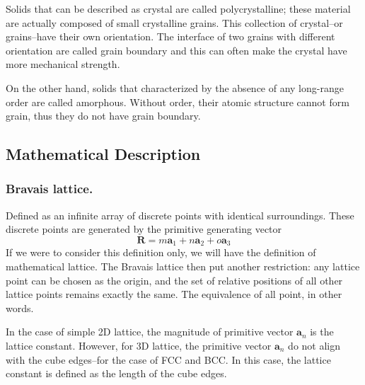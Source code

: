 \documentclass[../../../main.tex]{subfiles}
\begin{document}
Solids that can be described as crystal are called polycrystalline; these material are actually composed of small crystalline grains.
This collection of crystal--or grains--have their own orientation.
The interface of two grains with different orientation are called grain boundary and this can often make the crystal have more mechanical strength.

On the other hand, solids that  characterized by the absence of any long-range order are called amorphous. 
Without order, their atomic structure cannot form grain, thus they do not have grain boundary.

\subsection{Mathematical Description}
\subsubsection{Bravais lattice.} 
Defined as an infinite array of discrete points with identical surroundings. 
These discrete points are generated by the primitive generating vector
\begin{equation*}
    \mathbf{R} =m \mathbf{a }_1+n \mathbf{a }_2 +o \mathbf{a }_3
\end{equation*}
If we were to consider this definition only, we will have the definition of mathematical lattice.
The Bravais lattice then put another restriction: any lattice point can be chosen as the origin, and the set of relative positions of all other lattice points remains exactly the same.
The equivalence of all point, in other words.

In the case of simple 2D lattice, the magnitude of primitive vector $\mathbf{a }_n$ is the lattice constant.
However, for 3D lattice, the primitive vector $\mathbf{a }_n$ do not align with the cube edges--for the case of FCC and BCC.
In this case, the lattice constant is defined as the length of the cube edges.
\end{document}
